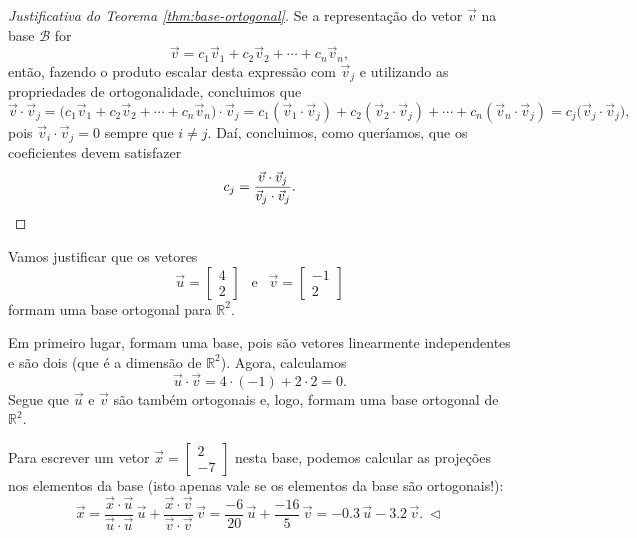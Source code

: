 \documentclass[../livro.tex]{subfiles}  %
\begin{document}
\begin{proof}[Justificativa do Teorema \ref{thm:base-ortogonal}]
	Se a representação do vetor $\vec{v}$ na base $\mathcal{B}$ for
	\begin{equation}
	\vec{v} = c_1 \vec{v}_1 + c_2 \vec{v}_2 + \cdots + c_n \vec{v}_n,
	\end{equation} então, fazendo o produto escalar desta expressão com $\vec{v}_j$ e utilizando as propriedades de ortogonalidade, concluimos que
	\begin{equation}
	\vec{v} \cdot \vec{v}_j = \big( c_1 \vec{v}_1 + c_2 \vec{v}_2 + \cdots + c_n \vec{v}_n \big) \cdot \vec{v}_j = c_1 (\vec{v}_1\cdot \vec{v}_j) + c_2 (\vec{v}_2\cdot \vec{v}_j) + \cdots + c_n (\vec{v}_n\cdot \vec{v}_j) = c_j \big( \vec{v}_j \cdot \vec{v}_j \big),
	\end{equation} pois $\vec{v}_i \cdot \vec{v}_j = 0$ sempre que $i \neq j$. Daí, concluimos, como queríamos, que os coeficientes devem satisfazer
	\begin{equation}
	c_j = \frac{\vec{v} \cdot \vec{v}_j}{\vec{v}_j \cdot \vec{v}_j}. \qedhere
	\end{equation}
\end{proof}

\begin{example}
	Vamos justificar que os vetores
	\begin{equation}
	\vec{u} =
	\begin{bmatrix}
	4 \\ 2
	\end{bmatrix} \ \ \text{ e }\ \
	\vec{v} =
	\begin{bmatrix}
	-1 \\ 2
	\end{bmatrix}
	\end{equation} formam uma base ortogonal para $\mathbb{R}^2$.
	
	Em primeiro lugar, formam uma base, pois são vetores linearmente independentes e são dois (que é a dimensão de $\mathbb{R}^2$). Agora, calculamos
	\begin{equation}
	\vec{u} \cdot \vec{v} = 4\cdot (-1) + 2\cdot 2 = 0.
	\end{equation} Segue que $\vec{u}$ e $\vec{v}$ são também ortogonais e, logo, formam uma base ortogonal de $\mathbb{R}^2$.
	
	Para escrever um vetor $\vec{x} =
	\begin{bmatrix}
	2 \\ -7
	\end{bmatrix}$ nesta base, podemos calcular as projeções nos elementos da base (isto apenas vale se os elementos da base são ortogonais!):
	\begin{equation}
	\vec{x} = \frac{\vec{x} \cdot \vec{u}}{\vec{u} \cdot \vec{u}} \, \vec{u} + \frac{\vec{x} \cdot \vec{v}}{\vec{v} \cdot \vec{v}} \, \vec{v} = \frac{-6}{20} \, \vec{u} + \frac{-16}{5} \, \vec{v} = -0.3 \, \vec{u} -3.2 \, \vec{v}. \ \lhd
	\end{equation}
\end{example}
\end{document}
